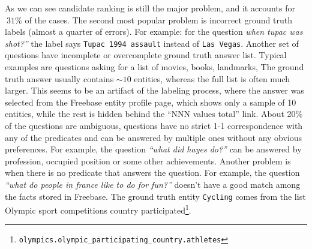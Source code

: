 As we can see candidate ranking is still the major problem, and it accounts for $~31\%$ of the cases.
The second most popular problem is incorrect ground truth labels (almost a quarter of errors).
For example: for the question \textit{when tupac was shot?''} the label says \texttt{Tupac 1994 assault} instead of \texttt{Las Vegas}.
Another set of questions have incomplete or overcomplete ground truth answer list.
Typical examples are questions asking for a list of movies, books, landmarks, \etc
The ground truth answer usually contains $\sim10$ entities, whereas the full list is often much larger.
This seems to be an artifact of the labeling process, where the answer was selected from the Freebase entity profile page, which shows only a sample of 10 entities, while the rest is hidden behind the ``NNN values total'' link.
About 20\% of the questions are ambiguous, \ie questions have no strict 1-1 correspondence with any of the predicates and can be answered by multiple ones without any obvious preferences.
For example, the question \textit{``what did hayes do?''} can be answered by profession, occupied position or some other achievements.
Another problem is when there is no predicate that answers the question.
For example, the question \textit{``what do people in france like to do for fun?''} doesn't have a good match among the facts stored in Freebase.
The ground truth entity \texttt{Cycling} comes from the list Olympic sport competitions country participated\footnote{\texttt{olympics.olympic\_participating\_country.athletes}}.


